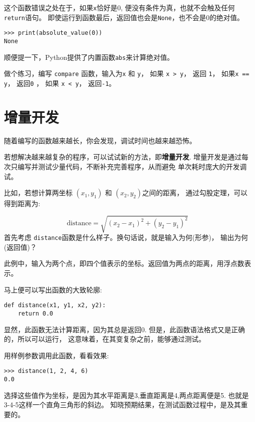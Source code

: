 \documentclass[10pt]{book}
\begin{document}
这个函数错误之处在于，如果{\tt x}恰好是0,
便没有条件为真，也就不会触及任何{\tt return}语句。
即使运行到函数最后，返回值也会是{\tt None}，也不会是0的绝对值。

\begin{verbatim}
>>> print(absolute_value(0))
None
\end{verbatim}
%
顺便提一下，Python提供了内置函数{\tt abs}来计算绝对值。

做个练习，编写 {\tt compare} 函数，输入为{\tt x} 和 {\tt y}，
如果 {\tt x > y}， 返回 {\tt 1}，
如果{\tt x == y}， 返回{\tt 0} ，
如果 {\tt x < y}， 返回{\tt -1}。


\section{增量开发}
\label{incremental.development}

随着编写的函数越来越长，你会发现，调试时间也越来越恐怖。

若想解决越来越复杂的程序，可以试试新的方法，即{\bf 增量开发}.
增量开发是通过每次只编写并测试少量代码，不断补充完善程序，从而避免
单次耗时庞大的开发调试。

比如，若想计算两坐标 $(x_1, y_1)$ 和 $(x_2, y_2)$之间的距离，
通过勾股定理，可以得到距离为:

\begin{displaymath}
\mathrm{distance} = \sqrt{(x_2 - x_1)^2 + (y_2 - y_1)^2}
\end{displaymath}
%
首先考虑 {\tt distance}函数是什么样子。换句话说，就是输入为何(形参)，
输出为何(返回值)？

此例中，输入为两个点，即四个值表示的坐标。返回值为两点的距离，用浮点数表示。

马上便可以写出函数的大致轮廓:

\begin{verbatim}
def distance(x1, y1, x2, y2):
    return 0.0
\end{verbatim}
%
显然，此函数无法计算距离，因为其总是返回0.
但是，此函数语法格式又是正确的，所以可以运行，
这意味着，在其变复杂之前，能够通过测试。

用样例参数调用此函数，看看效果:

\begin{verbatim}
>>> distance(1, 2, 4, 6)
0.0
\end{verbatim}
%
选择这些值作为坐标，是因为其水平距离是3,垂直距离是4,两点距离便是5.
也就是3-4-5这样一个直角三角形的斜边。
知晓预期结果，在测试函数过程中，是及其重要的。
\end{document}
